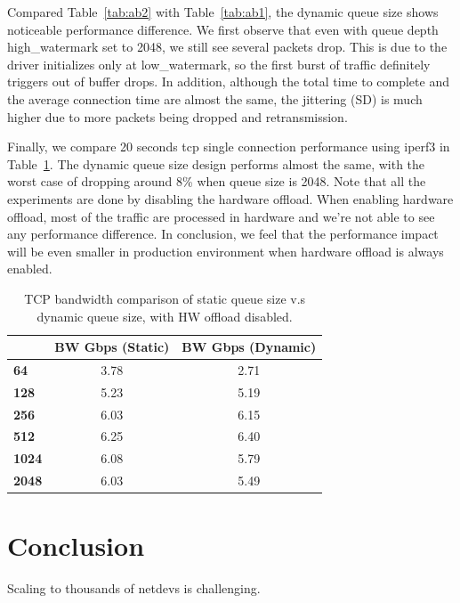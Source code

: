 \documentclass[letterpaper]{article}
\begin{document}
Compared Table~\ref{tab:ab2} with Table~\ref{tab:ab1}, the dynamic queue size shows noticeable
performance difference. We first observe that even with queue depth high\_watermark set to 2048,
we still see several packets drop. This is due to the driver initializes only at low\_watermark,
so the first burst of traffic definitely triggers out of buffer drops.
In addition, although the total time to complete and the average connection time are almost the
same, the jittering (SD) is much higher due to more packets being dropped and retransmission.


Finally, we compare 20 seconds tcp single connection performance using iperf3 in Table~\ref{tab:iperf}. 
The dynamic queue size design performs almost the same, with the worst case of
dropping around 8\% when queue size is 2048.
Note that all the experiments are done by disabling the hardware offload.
When enabling hardware offload, most of the traffic are processed in hardware and
we're not able to see any performance difference.
In conclusion, we feel that the performance impact will be even smaller in production
environment when hardware offload is always enabled.

\begin{table}[h!]
\centering
\footnotesize
\begin{tabular}{|l|c|c|}
\hline
\textbf{} & \textbf{BW Gbps (Static)} & \textbf{BW Gbps (Dynamic)} \\ \hline
\textbf{64}   & 3.78 & 2.71 \\ \hline
\textbf{128}  & 5.23 & 5.19 \\ \hline
\textbf{256}  & 6.03 & 6.15 \\ \hline
\textbf{512}  & 6.25 & 6.40  \\ \hline
\textbf{1024} & 6.08 & 5.79 \\ \hline
\textbf{2048} & 6.03 & 5.49 \\ \hline
\end{tabular}
\caption{TCP bandwidth comparison of static queue size v.s dynamic queue size, with HW offload disabled.}
\label{tab:iperf}
\end{table}



\section{Conclusion}
Scaling to thousands of netdevs is challenging.
\end{document}
